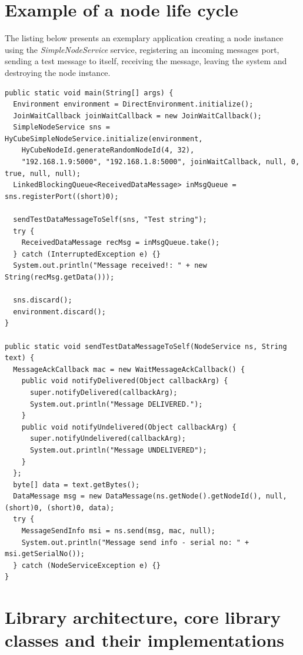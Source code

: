 \section{Example of a node life cycle}

The listing below presents an exemplary application creating a node instance using the \emph{SimpleNodeService} service, registering an incoming messages port, sending a test message to itself, receiving the message, leaving the system and destroying the node instance.

\begin{lstlisting}[style=listing1noindentsmall]
public static void main(String[] args) {
  Environment environment = DirectEnvironment.initialize();
  JoinWaitCallback joinWaitCallback = new JoinWaitCallback();
  SimpleNodeService sns = HyCubeSimpleNodeService.initialize(environment, 
    HyCubeNodeId.generateRandomNodeId(4, 32), 
    "192.168.1.9:5000", "192.168.1.8:5000", joinWaitCallback, null, 0, true, null, null);
  LinkedBlockingQueue<ReceivedDataMessage> inMsgQueue = sns.registerPort((short)0);

  sendTestDataMessageToSelf(sns, "Test string");
  try {
    ReceivedDataMessage recMsg = inMsgQueue.take();
  } catch (InterruptedException e) {}
  System.out.println("Message received!: " + new String(recMsg.getData()));

  sns.discard();
  environment.discard();
}

public static void sendTestDataMessageToSelf(NodeService ns, String text) {
  MessageAckCallback mac = new WaitMessageAckCallback() {
    public void notifyDelivered(Object callbackArg) {
      super.notifyDelivered(callbackArg);
      System.out.println("Message DELIVERED.");
    }
    public void notifyUndelivered(Object callbackArg) {
      super.notifyUndelivered(callbackArg);
      System.out.println("Message UNDELIVERED");
    }
  };
  byte[] data = text.getBytes();
  DataMessage msg = new DataMessage(ns.getNode().getNodeId(), null, (short)0, (short)0, data);
  try {
    MessageSendInfo msi = ns.send(msg, mac, null);
    System.out.println("Message send info - serial no: " + msi.getSerialNo());
  } catch (NodeServiceException e) {}
}	
\end{lstlisting}










\section{Library architecture, core library classes and their implementations}
\label{sec:libClasses}

